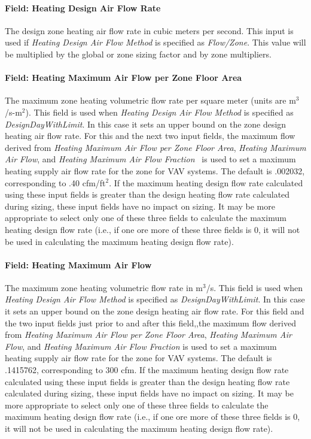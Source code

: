 \paragraph{Field: Heating Design Air Flow Rate}\label{field-heating-design-air-flow-rate}

The design zone heating air flow rate in cubic meters per second. This input is used if \emph{Heating Design Air Flow Method} is specified as \emph{Flow/Zone}. This value will be multiplied by the global or zone sizing factor and by zone multipliers.

\paragraph{Field: Heating Maximum Air Flow per Zone Floor Area}\label{field-heating-maximum-air-flow-per-zone-floor-area}

The maximum zone heating volumetric flow rate per square meter (units are m\(^{3}\)/s-m\(^{2}\)). This field is used when \emph{Heating Design Air Flow Method} is specified as \emph{DesignDayWithLimit}. In this case it sets an upper bound on the zone design heating air flow rate. For this and the next two input fields, the maximum flow derived from \emph{Heating Maximum Air Flow per Zone Floor Area}, \emph{Heating Maximum Air Flow}, and \emph{Heating Maximum Air Flow Fraction}~ is used to set a maximum heating supply air flow rate for the zone for VAV systems. The default is .002032, corresponding to .40 cfm/ft\(^{2}\). If the maximum heating design flow rate calculated using these input fields is greater than the design heating flow rate calculated during sizing, these input fields have no impact on sizing. It may be more appropriate to select only one of these three fields to calculate the maximum heating design flow rate (i.e., if one ore more of these three fields is 0, it will not be used in calculating the maximum heating design flow rate).

\paragraph{Field: Heating Maximum Air Flow}\label{field-heating-maximum-air-flow}

The maximum zone heating volumetric flow rate in m\(^{3}\)/s. This field is used when \emph{Heating Design Air Flow Method} is specified as \emph{DesignDayWithLimit}. In this case it sets an upper bound on the zone design heating air flow rate. For this field and the two input fields just prior to and after this field,,the maximum flow derived from \emph{Heating Maximum Air Flow per Zone Floor Area}, \emph{Heating Maximum Air Flow}, and \emph{Heating Maximum Air Flow Fraction} is used to set a maximum heating supply air flow rate for the zone for VAV systems. The default is .1415762, corresponding to 300 cfm. If the maximum heating design flow rate calculated using these input fields is greater than the design heating flow rate calculated during sizing, these input fields have no impact on sizing. It may be more appropriate to select only one of these three fields to calculate the maximum heating design flow rate (i.e., if one ore more of these three fields is 0, it will not be used in calculating the maximum heating design flow rate).

